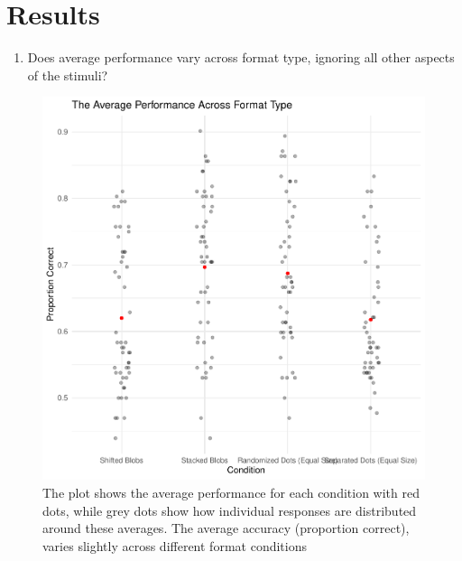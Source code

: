 \documentclass[
  man,floatsintext]{apa6}
\providecommand{\tightlist}{%
  \setlength{\itemsep}{0pt}\setlength{\parskip}{0pt}}
\begin{document}
\newpage

\section{Results}\label{results}

\begin{enumerate}
\def\labelenumi{\arabic{enumi}.}
\tightlist
\item
  Does average performance vary across format type, ignoring all other aspects of the stimuli?
\end{enumerate}

\begin{figure}
\includegraphics[width=0.8\linewidth]{Curi_11_files/figure-latex/plotone-1} \caption{The plot shows the average performance for each condition with red dots, while grey dots show how individual responses are distributed around these averages. The average accuracy (proportion correct), varies slightly across different format conditions}\label{fig:plotone}
\end{figure}

\newpage
\end{document}
